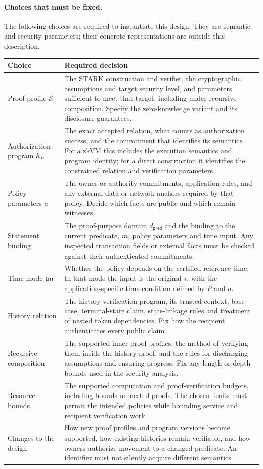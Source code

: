 \paragraph{Choices that must be fixed.}\label{sec:stark-predicate-choices}
The following choices are required to instantiate this design. They are semantic and security parameters; their concrete representations are outside this description.
\begin{longtable}{>{\raggedright\arraybackslash}p{3.1cm}p{10.5cm}}
\textbf{Choice} & \textbf{Required decision} \\
\hline
\endhead
Proof profile $\mathcal{S}$ & The STARK construction and verifier, the cryptographic assumptions and target security level, and parameters sufficient to meet that target, including under recursive composition. Specify the zero-knowledge variant and its disclosure guarantees. \\
Authorization program $h_P$ & The exact accepted relation, what counts as authorization success, and the commitment that identifies its semantics. For a zkVM this includes the execution semantics and program identity; for a direct construction it identifies the constrained relation and verification parameters. \\
Policy parameters $a$ & The owner or authority commitments, application rules, and any external-data or network anchors required by that policy. Decide which facts are public and which remain witnesses. \\
Statement binding & The proof-purpose domain $d_\mathsf{pred}$ and the binding to the current predicate, $m$, policy parameters and time input. Any inspected transaction fields or external facts must be checked against their authenticated commitments. \\
Time mode $\mathsf{tm}$ & Whether the policy depends on the certified reference time. In that mode the input is the original $\tau$, with the application-specific time condition defined by $P$ and $a$. \\
History relation & The history-verification program, its trusted context, base case, terminal-state claim, state-linkage rules and treatment of nested token dependencies. Fix how the recipient authenticates every public claim. \\
Recursive composition & The supported inner proof profiles, the method of verifying them inside the history proof, and the rules for discharging assumptions and ensuring progress. Fix any length or depth bounds used in the security analysis. \\
Resource bounds & The supported computation and proof-verification budgets, including bounds on nested proofs. The chosen limits must permit the intended policies while bounding service and recipient verification work. \\
Changes to the design & How new proof profiles and program versions become supported, how existing histories remain verifiable, and how owners authorize movement to a changed predicate. An identifier must not silently acquire different semantics. \\
\hline
\end{longtable}

